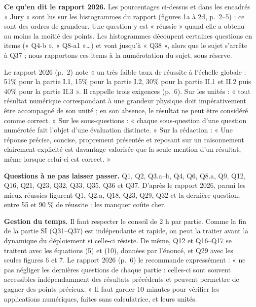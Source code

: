 \documentclass[11pt,a4paper]{article}
\begin{document}
\textbf{Ce qu'en dit le rapport 2026.} Les pourcentages ci-dessus et dans les encadrés « Jury » sont lus sur les histogrammes du rapport (figures 1a à 2d, p.~2--5) : ce sont des ordres de grandeur. Une question y est « réussie » quand elle a obtenu au moins la moitié des points. Les histogrammes découpent certaines questions en items (« Q4-b », « Q8-a1 »\ldots) et vont jusqu'à « Q38 », alors que le sujet s'arrête à Q37 ; nous rapportons ces items à la numérotation du sujet, sous réserve.

\begin{jury}

Le rapport 2026 (p.~2) note « un très faible taux de réussite à l'échelle globale : 51\% pour la partie I.1, 15\% pour la partie I.2, 30\% pour la partie II.1 et II.2 puis 40\% pour la partie II.3 ». Il rappelle trois exigences (p.~6). Sur les unités : « tout résultat numérique correspondant à une grandeur physique doit impérativement être accompagné de son unité ; en son absence, le résultat ne peut être considéré comme correct. » Sur les sous-questions : « chaque sous-question d'une question numérotée fait l'objet d'une évaluation distincte. » Sur la rédaction : « Une réponse précise, concise, proprement présentée et reposant sur un raisonnement clairement explicité est davantage valorisée que la seule mention d'un résultat, même lorsque celui-ci est correct. »

\end{jury}

\textbf{Questions à ne pas laisser passer.} Q1, Q2, Q3.a--b, Q4, Q6, Q8.a, Q9, Q12, Q16, Q21, Q23, Q32, Q33, Q35, Q36 et Q37. D'après le rapport 2026, parmi les mieux réussies figurent Q1, Q2.a, Q18, Q23, Q29, Q32 et la dernière question, entre 55 et 90 \% de réussite : les manquer coûte cher.

\textbf{Gestion du temps.} Il faut respecter le conseil de 2 h par partie. Comme la fin de la partie SI (Q31--Q37) est indépendante et rapide, on peut la traiter avant la dynamique du déploiement si celle-ci résiste. De même, Q12 et Q16--Q17 se traitent avec les équations (5) et (10), données par l'énoncé, et Q29 avec les seules figures 6 et 7. Le rapport 2026 (p.~6) le recommande expressément : « ne pas négliger les dernières questions de chaque partie : celles-ci sont souvent accessibles indépendamment des résultats précédents et peuvent permettre de gagner des points précieux. » Il faut garder 10 minutes pour vérifier les applications numériques, faites sans calculatrice, et leurs unités.
\end{document}
